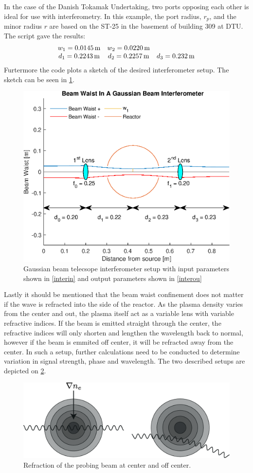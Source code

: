 In the case of the Danish Tokamak Undertaking, two ports opposing each other is ideal for use with interferometry. In this example, the port radius, \(r_p\), and the minor radius \(r\) are based on the ST-25 in the basement of building 309 at DTU.
The script gave the results:
\begin{align}
	\mqty{w_1 = \SI{0.0145}{\meter} & w_2 = \SI{0.0220}{\meter}                                            \\
	d_1 = \SI{0.2243}{\meter}       & d_2 = \SI{0.2257}{\meter} & d_3 = \SI{0.232}{\meter}}\label{interou}
\end{align}
Furtermore the code plots a sketch of the desired interferometer setup. The sketch can be seen in \cref{AWESOME}.
\begin{figure}
	\centering
	\includegraphics[width=.7\textwidth]{MatlabFigures/Interferometer/Interferometer.eps}
	\caption{Gaussian beam telecsope interferometer setup with input parameters shown in \cref{interin} and output parameters shown in \cref{interou}}
	\label{AWESOME}
\end{figure}
\newline Lastly it should be mentioned that the beam waist confinement does not matter if the wave is refracted into the side of the reactor. As the plasma density varies from the center and out, the plasma itself act as a variable lens with variable refractive indices. If the beam is emitted straight through the center, the refractive indices will only shorten and lengthen the wavelength back to normal, however if the beam is emmited off center, it will be refracted away from the center. In such a setup, further calculations need to be conducted to determine variation in signal strength, phase and wavelength. The two described setups are depicted on \cref{Refrac}.
\begin{figure}
	\centering
	\includegraphics[width=\textwidth]{Figures/Refraction.eps}
	\caption{Refraction of the probing beam at center and off center.}
	\label{Refrac}
\end{figure}
